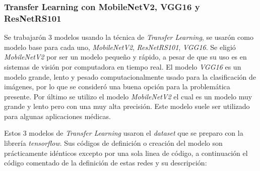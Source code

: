 \newpage

\subsubsection{Transfer Learning con MobileNetV2, VGG16 y ResNetRS101}

Se trabajarón 3 modelos usando la técnica de \textit{Transfer Learning}, se usarón como modelo base para cada uno, \textit{MobileNetV2}, \textit{ResNetRS101}, \textit{VGG16}. Se eligió \textit{MobileNetV2} por ser un modelo pequeño y rápido, a pesar de que su uso es en sistemas de visión por computadora en tiempo real. El modelo \textit{VGG16} es un modelo grande, lento y pesado computacionalmente usado para la clasificación de imágenes, por lo que se consideró una buena opción para la problemática presente. Por último se utilizo el modelo \textit{MobileNetV2} el cual es un modelo muy grande y lento pero con una muy alta precisión. Este modelo suele ser utilizado para algunas aplicaciones médicas.

Estos 3 modelos de \textit{Transfer Learning} usaron el \textit{dataset} que se preparo con la librería \textit{tensorflow}. Sus códigos de definición o creación del modelo son prácticamente idénticos excepto por una sola linea de código, a continuación el código comentado de la definición de estas redes y su descripción: \\


